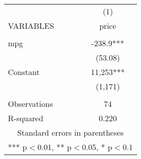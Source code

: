 \documentclass[]{article}
\begin{document}
\begin{tabular}{lc} \hline
 & (1) \\
VARIABLES & price \\ \hline
 &  \\
mpg & -238.9*** \\
 & (53.08) \\
Constant & 11,253*** \\
 & (1,171) \\
 &  \\
Observations & 74 \\
 R-squared & 0.220 \\ \hline
\multicolumn{2}{c}{ Standard errors in parentheses} \\
\multicolumn{2}{c}{ *** p$<$0.01, ** p$<$0.05, * p$<$0.1} \\
\end{tabular}
\end{document}
